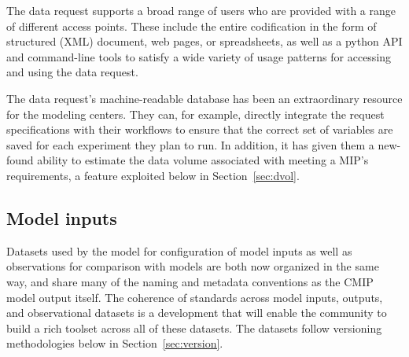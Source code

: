 \documentclass[gmd,manuscript]{copernicus}
\newcommand{\pllabel}[1]{\label{p-#1}\linelabel{l-#1}}
\begin{document}
The data request supports a broad range of users who are 
provided with a range of different access points. These include the
entire codification in the form of structured (XML) document, web
pages, or spreadsheets, as well as a python API and command-line tools
to satisfy a wide variety of usage patterns for accessing and using
the data request.


The data request's machine-readable database has been an extraordinary
resource for the modeling centers. They can, for example, directly
integrate the request specifications with their workflows to ensure
that the correct set of variables are saved for each experiment they
plan to run. In addition, it has given them a new-found ability to
estimate the data volume associated with meeting a MIP's requirements,
a feature exploited below in Section~\ref{sec:dvol}.

\subsection{Model inputs}
\label{sec:data-inputs}

Datasets used by the model for configuration of model inputs
\citep[\texttt{input4MIPs}, see][]{ref:duracketal2017} as well as
observations for comparison with models \citep[\texttt{obs4MIPs},
see][]{ref:teixeiraetal2014} are both now organized in the same way,
and share many of the naming and metadata conventions as the CMIP
model output itself.
\pllabel{RC3-9}
The coherence of standards across model inputs, outputs, and
observational datasets is a development that will enable the community
to build a rich toolset across all of these datasets. The datasets
follow versioning methodologies below in Section~\ref{sec:version}.
\end{document}
